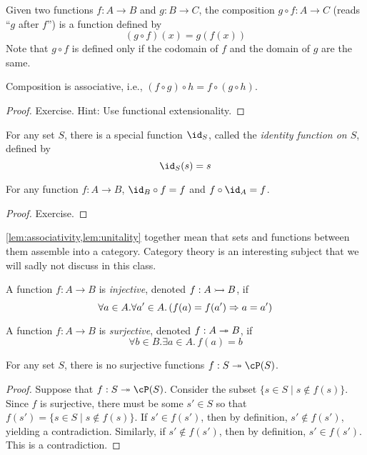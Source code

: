 \documentclass{amsart}
\begin{document}
\begin{defn}
  Given two functions $f : A \to B$ and $g : B \to C$, the composition $g \circ f : A \to C$ (reads ``$g$ after $f$'') is a function defined by
  \[
    (g \circ f)(x) = g(f(x))
  \]
  Note that $g \circ f$ is defined only if the codomain of $f$ and the domain of $g$ are the same.
\end{defn}

\begin{lem}\label{lem:associativity}
  Composition is associative, i.e., $(f \circ g) \circ h = f \circ (g \circ h)$.
\end{lem}
\begin{proof}
  Exercise.
  Hint: Use functional extensionality.
\end{proof}

\begin{defn}
  For any set $S$, there is a special function $\id_{S}$, called the \emph{identity function on $S$}, defined by
  \[
    \id_{S}(s) = s
  \]
\end{defn}

\begin{lem}\label{lem:unitality}
  For any function $f : A \to B$, $\id_{B} \circ f = f$ and $f \circ \id_{A} = f$.
\end{lem}
\begin{proof}
  Exercise.
\end{proof}

\cref{lem:associativity,lem:unitality} together mean that sets and functions between them assemble into a category.
Category theory is an interesting subject that we will sadly not discuss in this class.

\begin{defn}
  A function $f : A \to B$ is \emph{injective}, denoted $f : A \rightarrowtail B$, if
  \[
    \forall a \in A.\forall a' \in A.\,(f(a) = f(a') \Rightarrow a = a')
  \]
\end{defn}

\begin{defn}
  A function $f : A \to B$ is \emph{surjective}, denoted $f : A \twoheadrightarrow B$, if
  \[
    \forall b \in B.\exists a \in A.\,f(a) = b
  \]
\end{defn}

\begin{thm}
  For any set $S$, there is no surjective functions $f : S \epi \cP(S)$.
\end{thm}
\begin{proof}
  Suppose that $f : S \epi \cP(S)$.
  Consider the subset $\{s \in S \mid s \notin f(s)\}$.
  Since $f$ is surjective, there must be some $s' \in S$ so that $f(s') = \{s \in S \mid s \notin f(s)\}$.
  If $s' \in f(s')$, then by definition, $s' \notin f(s')$, yielding a contradiction.
  Similarly, if $s' \notin f(s')$, then by definition, $s' \in f(s')$.
  This is a contradiction.
\end{proof}
\end{document}
